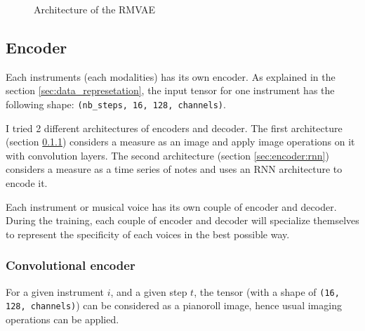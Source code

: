 \documentclass[12pt]{report}
\begin{document}
\begin{figure}
\begin{center}
\caption{Architecture of the RMVAE}
\label{fig:rmvae_architecture}
\end{center}
\end{figure}

\subsection{Encoder}
\label{sec:encoder}

Each instruments (each modalities) has its own encoder.
As explained in the section \ref{sec:data_represetation}, the input tensor for one instrument has the following shape: \texttt{(nb\_steps, 16, 128, channels)}.

I tried 2 different architectures of encoders and decoder.
The first architecture (section \ref{sec:encoder:cnn}) considers a measure as an image and apply image operations on it with convolution layers.
The second architecture (section \ref{sec:encoder:rnn}) considers a measure as a time series of notes and uses an RNN architecture to encode it.

Each instrument or musical voice has its own couple of encoder and decoder.
During the training, each couple of encoder and decoder will specialize themselves to represent the specificity of each voices in the best possible way.

\subsubsection{Convolutional encoder}
\label{sec:encoder:cnn}

For a given instrument $i$, and a given step $t$, the tensor (with a shape of \texttt{(16, 128, channels)}) can be considered as a pianoroll image, hence usual imaging operations can be applied.
\end{document}
